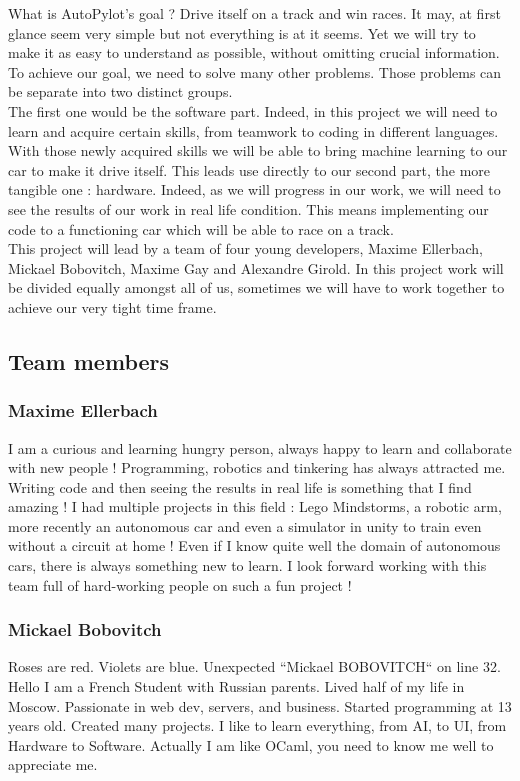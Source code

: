 \documentclass[12pt]{article}
\begin{document}
What is AutoPylot's goal ? 
Drive itself on a track and win races. It may, at first glance seem very simple but not everything is at it seems. Yet we will try to make it as easy to understand as possible, without omitting crucial information. To achieve our goal, we need to solve many other problems. Those problems can be separate into two distinct groups. \\

The first one would be the software part. Indeed, in this project we will need to learn and acquire certain skills, from teamwork to coding in different languages. With those newly acquired skills we will be able to bring machine learning to our car to make it drive itself. This leads use directly to our second part, the more tangible one : hardware. Indeed, as we will progress in our work, we will need to see the results of our work in real life condition. This means implementing our code to a functioning car which will be able to race on a track. \\

This project will lead by a team of four young developers, Maxime Ellerbach, Mickael Bobovitch, Maxime Gay and Alexandre Girold. In this project work will be divided equally amongst all of us, sometimes we will have to work together to achieve our very tight time frame. 

\subsection{Team members}

\subsubsection{Maxime Ellerbach}
I am a curious and learning hungry person, always happy to learn and collaborate with new people ! Programming, robotics and tinkering has always attracted me. Writing code and then seeing the results in real life is something that I find amazing ! I had multiple projects in this field : Lego Mindstorms, a robotic arm, more recently an autonomous car and even a simulator in unity to train even without a circuit at home ! Even if I know quite well the domain of autonomous cars, there is always something new to learn. I look forward working with this team full of hard-working people on such a fun project !

\subsubsection{Mickael Bobovitch}
Roses are red. Violets are blue. Unexpected “Mickael BOBOVITCH“ on line 32. Hello I am a French Student with Russian parents. Lived half of my life in Moscow. Passionate in web dev, servers, and business. Started programming at 13 years old. Created many projects. I like to learn everything, from AI, to UI, from Hardware to Software. Actually I am like OCaml, you need to know me well to appreciate me.
\end{document}
